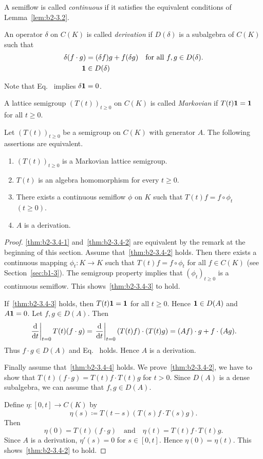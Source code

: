 A semiflow is called \emph{continuous} if it satisfies the equivalent conditions of Lemma~\ref{lem:b2-3.2}.
\begin{definition}\label{def:b2-3.3}
An operator $\delta$ on $C(K)$ is called \emph{derivation} if\/ $D(\delta)$ is a subalgebra of\/ $C(K)$ such that
\begin{align}
\delta(f \cdot g) &= (\delta f)g + f(\delta g) \quad \text{for all } f,g \in D(\delta). \label{eq:b2-3.4} \\
\mathbf{1} &\in D(\delta) \label{eq:b2-3.5}
\end{align}
\end{definition}
Note that Eq.~ implies $\delta\mathbf{1} = 0$.

A lattice semigroup $(T(t))_{t \geq 0}$ on $C(K)$ is called \emph{Markovian} if\/ $T(t)\mathbf{1} = \mathbf{1}$ for all $t \geq 0$.
\begin{theorem}\label{thm:b2-3.4}
Let $(T(t))_{t \geq 0}$ be a semigroup on $C(K)$ with generator $A$.
The following assertions are equivalent.
\begin{enumerate}[\upshape (a)]
\item \label{thm:b2-3.4-1}
$(T(t))_{t \geq 0}$ is a Markovian lattice semigroup.
\item \label{thm:b2-3.4-2}
$T(t)$ is an algebra homomorphism for every $t \geq 0$.
\item \label{thm:b2-3.4-3}
There exists a continuous semiflow $\phi$ on $K$ such that $T(t)f = f \circ \phi_{t}$ $(t \geq 0)$.
\item \label{thm:b2-3.4-4}
$A$ is a derivation.
\end{enumerate}
\end{theorem}
\begin{proof}
\ref{thm:b2-3.4-1} and~\ref{thm:b2-3.4-2} are equivalent by the remark at the beginning of this section.
Assume that~\ref{thm:b2-3.4-2} holds.
Then there exists a continuous mapping $\phi_{t} \colon K \to K$ such that $T(t)f = f \circ \phi_{t}$ for all $f \in C(K)$ (see Section~\ref{sec:b1-3}).
The semigroup property implies that $(\phi_{t})_{t \geq 0}$ is a continuous semiflow.
This shows~\ref{thm:b2-3.4-3}  to hold.

If~\ref{thm:b2-3.4-3} holds, then $T(t)\mathbf{1} = \mathbf{1}$ for all $t \geq 0$. Hence $\mathbf{1} \in D(A)$ and $A\mathbf{1} = 0$.
Let $f,g \in D(A)$.
Then 
%
\[
	\left.\frac{\mathop{}\!\mathrm{d}{}}{\mathop{}\!\mathrm{d}{t}}\right|_{t=0} T(t)(f \cdot g) = \left.\frac{\mathop{}\!\mathrm{d}{}}{\mathop{}\!\mathrm{d}{t}}\right|_{t=0} (T(t)f) \cdot (T(t)g) = (Af) \cdot g + f \cdot (Ag).
\]
%
Thus $f \cdot g \in D(A)$ and Eq.~ holds.
Hence $A$ is a derivation.

Finally assume that~\ref{thm:b2-3.4-4} holds.
We prove~\ref{thm:b2-3.4-2}, \ie  we have to show that $T(t)(f \cdot g) = T(t)f \cdot T(t)g$ for $t > 0$.
Since $D(A)$ is a dense subalgebra, we can assume that $f,g \in D(A)$.

Define $\eta \colon [0,t] \to C(K)$ by 
%
\[
	\eta(s) \coloneq T(t-s) ( T(s)f \cdot T(s)g ).
\]
%
Then 
%
\[
	\eta(0) = T(t)(f \cdot g)
	\quad \text{and} \quad
	\eta(t) = T(t)f \cdot T(t)g.
\]
%
Since $A$ is a derivation, $\eta'(s) = 0$ for $s \in [0,t]$.
Hence $\eta(0) = \eta(t)$.
This shows~\ref{thm:b2-3.4-2} to hold.
\end{proof}
